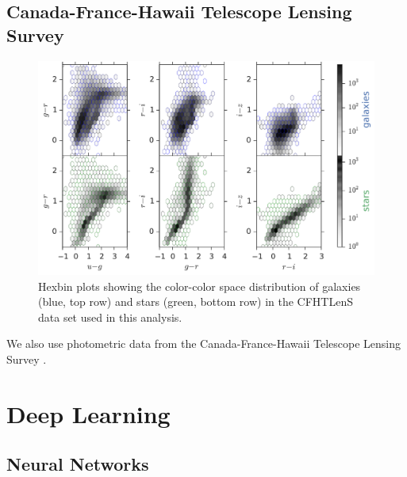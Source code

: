 \documentclass[fleqn,usenatbib]{mnras}
\begin{document}
\subsection{Canada-France-Hawaii Telescope Lensing Survey}

\begin{figure}
  \centering
  \includegraphics[width=\columnwidth]{figures/clens_color_color.pdf}
  \caption{
    Hexbin plots showing the color-color space distribution of
    galaxies (blue, top row) and stars (green, bottom row)
    in the CFHTLenS data set used in this analysis.
  }
  \label{fig:clens_color_color}
\end{figure}

We also use photometric data from
the Canada-France-Hawaii Telescope Lensing Survey
\cite[CFHTLenS\footnote{http://www.cfhtlens.org/};][]
{heymans2012cfhtlens,erben2013cfhtlens,hildebrandt2012cfhtlens}.

\section{Deep Learning}
  \label{sec:deep_learning}

\subsection{Neural Networks}
\end{document}
